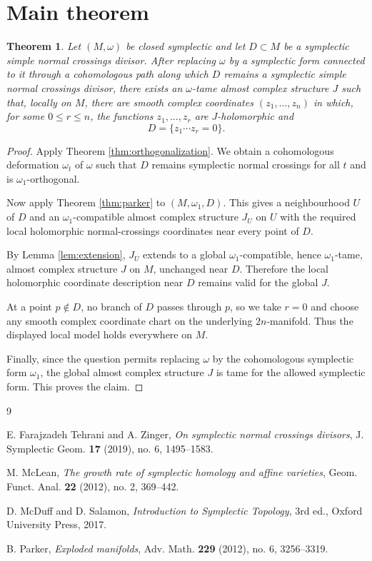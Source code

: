 \documentclass[11pt]{article}
\newtheorem{theorem}{Theorem}
\begin{document}
\section*{Main theorem}

\begin{theorem}
Let $(M,\omega)$ be closed symplectic and let $D\subset M$ be a symplectic
simple normal crossings divisor.  After replacing $\omega$ by a symplectic form
connected to it through a cohomologous path along which $D$ remains a
symplectic simple normal crossings divisor, there exists an $\omega$-tame
almost complex structure $J$ such that, locally on $M$, there are smooth complex
coordinates $(z_1,\ldots,z_n)$ in which, for some $0\le r\le n$, the functions
$z_1,\ldots,z_r$ are $J$-holomorphic and
\[
D=\{z_1\cdots z_r=0\}.
\]
\end{theorem}

\begin{proof}
Apply Theorem \ref{thm:orthogonalization}.  We obtain a cohomologous deformation
$\omega_t$ of $\omega$ such that $D$ remains symplectic normal crossings for all
$t$ and is $\omega_1$-orthogonal.

Now apply Theorem \ref{thm:parker} to $(M,\omega_1,D)$.  This gives a
neighbourhood $U$ of $D$ and an $\omega_1$-compatible almost complex structure
$J_U$ on $U$ with the required local holomorphic normal-crossings coordinates
near every point of $D$.

By Lemma \ref{lem:extension}, $J_U$ extends to a global $\omega_1$-compatible,
hence $\omega_1$-tame, almost complex structure $J$ on $M$, unchanged near
$D$.  Therefore the local holomorphic coordinate description near $D$ remains
valid for the global $J$.

At a point $p\notin D$, no branch of $D$ passes through $p$, so we take
$r=0$ and choose any smooth complex coordinate chart on the underlying
$2n$-manifold.  Thus the displayed local model holds everywhere on $M$.

Finally, since the question permits replacing $\omega$ by the cohomologous
symplectic form $\omega_1$, the global almost complex structure $J$ is tame for
the allowed symplectic form.  This proves the claim.
\end{proof}

\begin{thebibliography}{9}

E. Farajzadeh Tehrani and A. Zinger,
\emph{On symplectic normal crossings divisors},
J. Symplectic Geom. \textbf{17} (2019), no. 6, 1495--1583.

M. McLean,
\emph{The growth rate of symplectic homology and affine varieties},
Geom. Funct. Anal. \textbf{22} (2012), no. 2, 369--442.

D. McDuff and D. Salamon,
\emph{Introduction to Symplectic Topology},
3rd ed., Oxford University Press, 2017.

B. Parker,
\emph{Exploded manifolds},
Adv. Math. \textbf{229} (2012), no. 6, 3256--3319.

\end{thebibliography}
\end{document}
